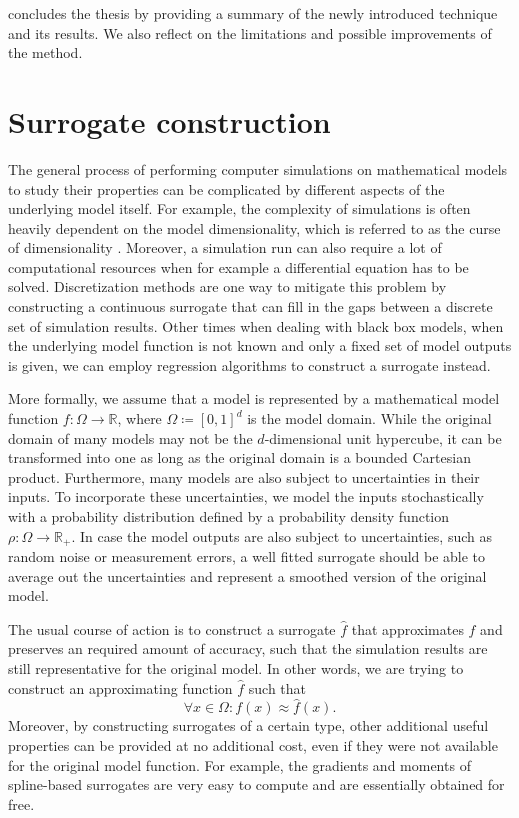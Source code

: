 \documentclass[
  a4paper,  %
  twoside,  %
  bibliography=totoc,
  headsepline,
  cleardoublepage=empty,
  parskip=half,
  draft=false
]{scrbook}
\begin{document}
 concludes the thesis by providing a summary of the newly introduced technique and its results.
We also reflect on the limitations and possible improvements of the method.

\chapter{Surrogate construction}
\label{chap:c2}

The general process of performing computer simulations on mathematical models to study their properties can be complicated by different aspects of the underlying model itself.
For example, the complexity of simulations is often heavily dependent on the model dimensionality, which is referred to as the curse of dimensionality \cite{Bellman1961}.
Moreover, a simulation run can also require a lot of computational resources when for example a differential equation has to be solved.
Discretization methods are one way to mitigate this problem by constructing a continuous surrogate that can fill in the gaps between a discrete set of simulation results.
Other times when dealing with black box models, \ie when the underlying model function is not known and only a fixed set of model outputs is given, we can employ regression algorithms to construct a surrogate instead.

More formally, we assume that a model is represented by a mathematical model function $f \colon \Omega \to \mathds{R}$, where $\Omega \coloneqq [0,1]^d$ is the model domain.
While the original domain of many models may not be the $d$-dimensional unit hypercube, it can be transformed into one as long as the original domain is a bounded Cartesian product.
Furthermore, many models are also subject to uncertainties in their inputs.
To incorporate these uncertainties, we model the inputs stochastically with a probability distribution defined by a probability density function $\rho \colon \Omega \to \mathds{R_+}$.
In case the model outputs are also subject to uncertainties, such as random noise or measurement errors, a well fitted surrogate should be able to average out the uncertainties and represent a smoothed version of the original model.

The usual course of action is to construct a surrogate $\hat{f}$ that approximates $f$ and preserves an required amount of accuracy, such that the simulation results are still representative for the original model.
In other words, we are trying to construct an approximating function $\hat{f}$ such that
\begin{equation}
\forall x \in \Omega \colon f(x) \approx \hat{f}(x).
\end{equation}
Moreover, by constructing surrogates of a certain type, other additional useful properties can be provided at no additional cost, even if they were not available for the original model function.
For example, the gradients and moments of spline-based surrogates are very easy to compute and are essentially obtained for free.
\end{document}

